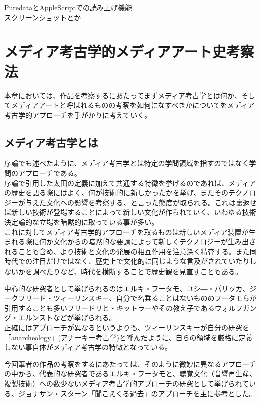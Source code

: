 PuredataとAppleScriptでの読み上げ機能\\
スクリーンショットとか

\chapter{メディア考古学的メディアアート史考察法}\label{ux30e1ux30c7ux30a3ux30a2ux8003ux53e4ux5b66ux7684ux30e1ux30c7ux30a3ux30a2ux30a2ux30fcux30c8ux53f2ux8003ux5bdfux6cd5}

本章においては、作品を考察するにあたってまずメディア考古学とは何か、そしてメディアアートと呼ばれるものの考察を如何になすべきかについてをメディア考古学的アプローチを手がかりに考えていく。

\section{メディア考古学とは}\label{ux30e1ux30c7ux30a3ux30a2ux8003ux53e4ux5b66ux3068ux306f}

序論でも述べたように、メディア考古学とは特定の学問領域を指すのではなく学問のアプローチである。\\
序論で引用した太田の定義に加えて共通する特徴を挙げるのであれば、メディアの歴史を語る際にはよく、何が技術的に新しかったかを挙げ、またそのテクノロジーが与えた文化への影響を考察する、と言った態度が取られる。これは裏返せば新しい技術が登場することによって新しい文化が作られていく、いわゆる技術決定論的な立場を暗黙的に取っている事が多い。\\
これに対してメディア考古学的アプローチを取るものは新しいメディア装置が生まれる際に何か文化からの暗黙的な要請によって新しくテクノロジーが生み出されることも含め、より技術と文化の発展の相互作用を注意深く精査する。また同時代での注目だけではなく、歴史上で文化的に同じような言及がされていたりしないかを調べたりなど、時代を横断することで歴史観を見直すこともある。

中心的な研究者として挙げられるのはエルキ・フータモ、ユシ―・パリッカ、ジークフリード・ツィーリンスキー、自分で名乗ることはないもののフータモらが引用することも多いフリードリヒ・キットラーやその教え子であるウォルフガング・エルンストなどが挙げられる。\\
正確にはアプローチが異なるというよりも、ツィーリンスキーが自分の研究を「anarcheology」(アナーキー考古学)と呼んだように、自らの領域を厳格に定義しない事自体がメディア考古学の特徴となっている。

今回筆者の作品の考察をするにあたっては、そのように微妙に異なるアプローチの中から、代表的な研究者であるエルキ・フータモと、聴覚文化（音響再生産、複製技術）への数少ないメディア考古学的アプローチの研究として挙げられている、ジョナサン・スターン「聞こえくる過去」\autocite{stern:audiblepast}のアプローチを主に参考とした。

